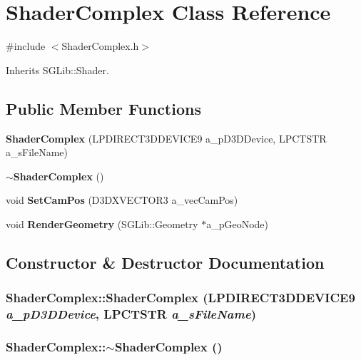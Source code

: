 \section{ShaderComplex Class Reference}
\label{class_shader_complex}


{\ttfamily \#include $<$ShaderComplex.h$>$}

Inherits SGLib::Shader.\subsection*{Public Member Functions}
\begin{DoxyCompactItemize}
\item 
{\bf ShaderComplex} (LPDIRECT3DDEVICE9 a\_\-pD3DDevice, LPCTSTR a\_\-sFileName)
\item 
{\bf $\sim$ShaderComplex} ()
\item 
void {\bf SetCamPos} (D3DXVECTOR3 a\_\-vecCamPos)
\item 
void {\bf RenderGeometry} (SGLib::Geometry $\ast$a\_\-pGeoNode)
\end{DoxyCompactItemize}


\subsection{Constructor \& Destructor Documentation}
\subsubsection[{ShaderComplex}]{\setlength{\rightskip}{0pt plus 5cm}ShaderComplex::ShaderComplex (LPDIRECT3DDEVICE9 {\em a\_\-pD3DDevice}, \/  LPCTSTR {\em a\_\-sFileName})\hspace{0.3cm}{\ttfamily  [inline]}}\label{class_shader_complex_afba6f07a65c40f3f2622eacfc7114aae}
\subsubsection[{$\sim$ShaderComplex}]{\setlength{\rightskip}{0pt plus 5cm}ShaderComplex::$\sim$ShaderComplex ()\hspace{0.3cm}{\ttfamily  [inline]}}\label{class_shader_complex_a38d80ff68a761b0a8f2e9e0540fe423b}


